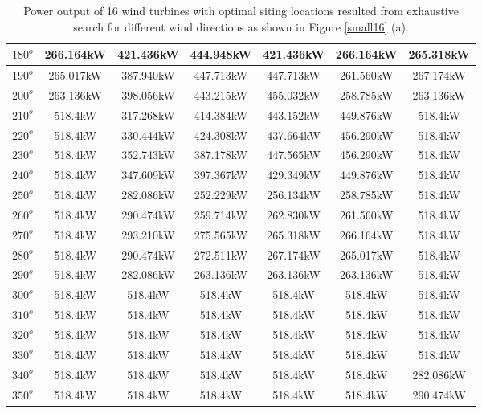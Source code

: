 \begin{table}[H]
\begin{tabular}{|c|c|c|c|c|c|c|}
		$180^o$	& 266.164kW	& 421.436kW	& 444.948kW	& 421.436kW	& 266.164kW	& 265.318kW	\\ \hline
		$190^o$	& 265.017kW	& 387.940kW	& 447.713kW	& 447.713kW	& 261.560kW	& 267.174kW	\\ \hline
		$200^o$	& 263.136kW	& 398.056kW	& 443.215kW	& 455.032kW	& 258.785kW	& 263.136kW	\\ \hline
		$210^o$	& 518.4kW	& 317.268kW	& 414.384kW	& 443.152kW	& 449.876kW	& 518.4kW	\\ \hline
		$220^o$	& 518.4kW	& 330.444kW	& 424.308kW	& 437.664kW	& 456.290kW	& 518.4kW	\\ \hline
		$230^o$	& 518.4kW	& 352.743kW	& 387.178kW	& 447.565kW	& 456.290kW	& 518.4kW	\\ \hline
		$240^o$	& 518.4kW	& 347.609kW	& 397.367kW	& 429.349kW	& 449.876kW	& 518.4kW	\\ \hline
		$250^o$	& 518.4kW	& 282.086kW	& 252.229kW	& 256.134kW	& 258.785kW	& 518.4kW	\\ \hline
		$260^o$	& 518.4kW	& 290.474kW	& 259.714kW	& 262.830kW	& 261.560kW	& 518.4kW	\\ \hline
		$270^o$	& 518.4kW	& 293.210kW	& 275.565kW	& 265.318kW	& 266.164kW	& 518.4kW	\\ \hline
		$280^o$	& 518.4kW	& 290.474kW	& 272.511kW	& 267.174kW	& 265.017kW	& 518.4kW	\\ \hline
		$290^o$	& 518.4kW	& 282.086kW	& 263.136kW	& 263.136kW	& 263.136kW	& 518.4kW	\\ \hline
		$300^o$	& 518.4kW	& 518.4kW	& 518.4kW	& 518.4kW	& 518.4kW	& 518.4kW	\\ \hline
		$310^o$	& 518.4kW	& 518.4kW	& 518.4kW	& 518.4kW	& 518.4kW	& 518.4kW	\\ \hline
		$320^o$	& 518.4kW	& 518.4kW	& 518.4kW	& 518.4kW	& 518.4kW	& 518.4kW	\\ \hline
		$330^o$	& 518.4kW	& 518.4kW	& 518.4kW	& 518.4kW	& 518.4kW	& 518.4kW	\\ \hline
		$340^o$	& 518.4kW	& 518.4kW	& 518.4kW	& 518.4kW	& 518.4kW	& 282.086kW	\\ \hline
		$350^o$	& 518.4kW	& 518.4kW	& 518.4kW	& 518.4kW	& 518.4kW	& 290.474kW	\\ \hline
        	\end{tabular}
        	\caption{Power output of 16 wind turbines with optimal siting locations resulted from exhaustive search for different wind directions as shown in Figure \ref{small16} (a).}
        	\label{table16a}
        \end{table}
